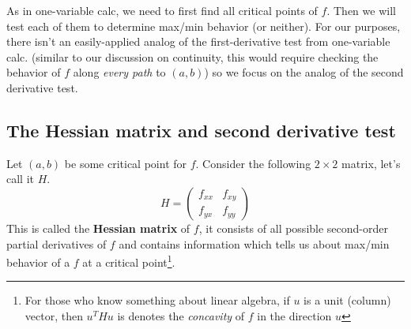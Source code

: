 \documentclass[12pt]{article}
\numberwithin{equation}{subsection}
\numberwithin{figure}{subsection}
\theoremstyle{note}
\begin{document}
{As in one-variable calc, we need to first find all critical points of $f$. Then we will test each of them to determine max/min behavior (or neither). For our purposes, there isn't an easily-applied analog of the first-derivative test from one-variable calc. (similar to our discussion on continuity, this would require checking the behavior of $f$ along \textit{every path} to $(a,b)$) so we focus on the analog of the second derivative test. 



\subsection{The Hessian matrix and second derivative test}
Let $(a,b)$ be some critical point for $f$. Consider the following $2\times 2$ matrix, let's call it $H$. \begin{equation} \label{Hessian} H=\begin{pmatrix} f_{xx} & f_{xy} \\ f_{yx} & f_{yy} \end{pmatrix} \end{equation}
This is called the \textbf{Hessian matrix} of $f$, it consists of all possible second-order partial derivatives of $f$ and contains information which tells us about max/min behavior of a $f$ at a critical point\footnote{For those who know something about linear algebra, if $u$ is a unit (column) vector, then $u^T H u$ is denotes the \textit{concavity} of $f$ in the direction $u$}.


}
\end{document}
